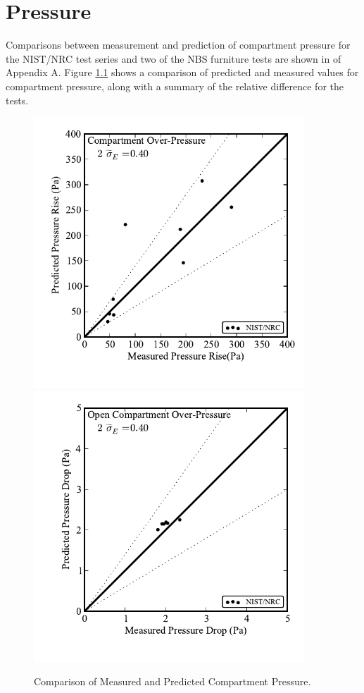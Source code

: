 \chapter{Pressure}

Comparisons between measurement and prediction of compartment pressure for the NIST/NRC test series and two of the NBS furniture tests are shown in of Appendix A.  Figure \ref{fig:Pressure_Scatter} shows a comparison of predicted and measured values for compartment pressure, along with a summary of the relative difference for the tests.

\begin{figure}
\begin{center}
\includegraphics[width=4.0in]{FIGURES/ScatterPlots/Compartment_Pressure}  \\
\includegraphics[width=4.0in]{FIGURES/ScatterPlots/Open_Compartment_Pressure}  \\
\end{center}
\caption{Comparison of Measured and Predicted Compartment Pressure.} \label{fig:Pressure_Scatter}
\end{figure}


